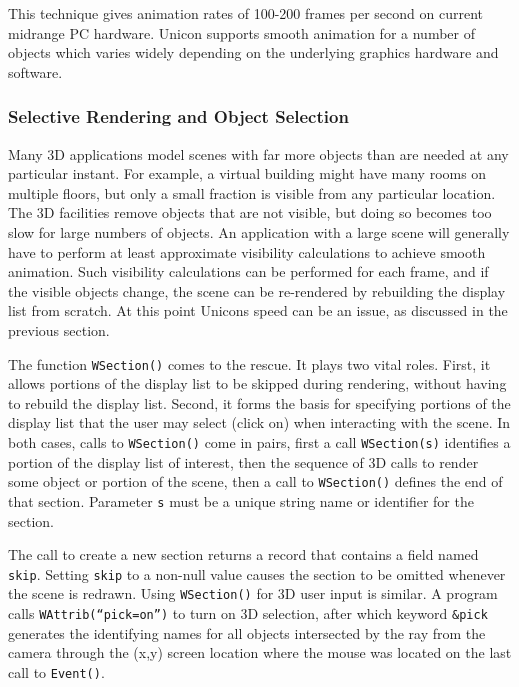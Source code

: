 
This technique gives animation rates of 100-200 frames per second on
current midrange PC hardware. Unicon supports smooth animation for a
number of objects which varies widely depending on the underlying
graphics hardware and software.

\subsubsection{Selective Rendering and Object Selection}

Many 3D applications model scenes with far more objects than are needed
at any particular instant. For example, a virtual building might have
many rooms on multiple floors, but only a small fraction is visible
from any particular location. The 3D facilities remove objects that are
not visible, but doing so becomes too slow for large numbers of
objects. An application with a large scene will generally have to
perform at least approximate visibility calculations to achieve smooth
animation. Such visibility calculations can be performed for each
frame, and if the visible objects change, the scene can be re-rendered
by rebuilding the display list from scratch. At this point
Unicon{\textquotesingle}s speed can be an issue, as discussed in the
previous section.

The function \texttt{WSection()} comes to the rescue. It plays two vital
roles. First, it allows portions of the display list to be skipped
during rendering, without having to rebuild the display list. Second,
it forms the basis for specifying portions of the display list that the
user may select (click on) when interacting with the scene. In both
cases, calls to \texttt{WSection()} come in pairs, first a call
\texttt{WSection(s)} identifies a portion of the display list of
interest, then the sequence of 3D calls to render some object or
portion of the scene, then a call to \texttt{WSection()} defines the
end of that section. Parameter \texttt{s} must be a unique string name
or identifier for the section.

The call to create a new section returns a record that contains a field
named \texttt{skip}. Setting \texttt{skip} to a non-null value causes the
section to be omitted whenever the scene is redrawn.
Using \texttt{WSection()} for 3D user input is similar. A program calls
\texttt{WAttrib({\textquotedblleft}pick=on{\textquotedblright})} to
turn on 3D selection, after which keyword \texttt{\&pick} generates the
identifying names for all objects intersected by the ray from the
camera through the (x,y) screen location where the mouse was located on
the last call to \texttt{Event()}.

